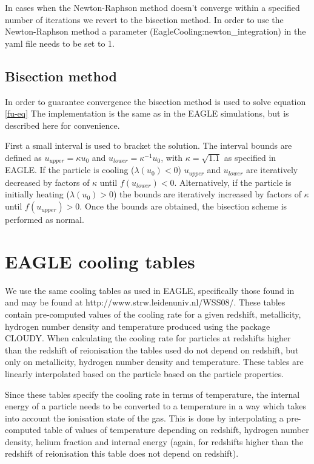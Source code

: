 \documentclass[fleqn, usenatbib, useAMS, a4paper]{mnras}
\begin{document}
In cases when the Newton-Raphson method doesn't converge within a specified
number of iterations we revert to the bisection method. In order to use
the Newton-Raphson method a parameter (EagleCooling:newton\_integration) in 
the yaml file needs to be set to 1.

\subsection{Bisection method}

In order to guarantee convergence the bisection method is used to solve 
equation \ref{fu-eq} The implementation is the same as in the EAGLE 
simulations, but is described here for convenience. 

First a small interval is used to bracket the solution. The interval bounds
are defined as $u_{upper} = \kappa u_0$ and $u_{lower} = \kappa^{-1} u_0$, 
with $\kappa = \sqrt{1.1}$ as specified in EAGLE. If the particle is cooling
($\lambda(u_0) < 0$) $u_{upper}$ and $u_{lower}$ are iteratively decreased
by factors of $\kappa$ until $f(u_{lower}) < 0$. Alternatively, if the 
particle is initially heating ($\lambda(u_0) > 0$) the bounds are iteratively
increased by factors of $\kappa$ until $f(u_{upper}) > 0$. Once the bounds
are obtained, the bisection scheme is performed as normal. 

\section{EAGLE cooling tables}

We use the same cooling tables as used in EAGLE, specifically those found in 
\cite{Wiersma2009} and may be found at http://www.strw.leidenuniv.nl/WSS08/. 
These tables contain pre-computed values of the cooling rate for a given 
redshift, metallicity, hydrogen number density and temperature produced using 
the package CLOUDY. When calculating the cooling rate for particles at 
redshifts higher than the redshift of reionisation the tables used do not 
depend on redshift, but only on metallicity, hydrogen number density and 
temperature. These tables are linearly interpolated based on the particle
based on the particle properties. 

Since these tables specify the cooling rate in terms of temperature, the internal
energy of a particle needs to be converted to a temperature in a way which takes 
into account the ionisation state of the gas. This is done by interpolating a 
pre-computed table of values of temperature depending on redshift, hydrogen number
density, helium fraction and internal energy (again, for redshifts higher than the 
redshift of reionisation this table does not depend on redshift). 
\end{document}
